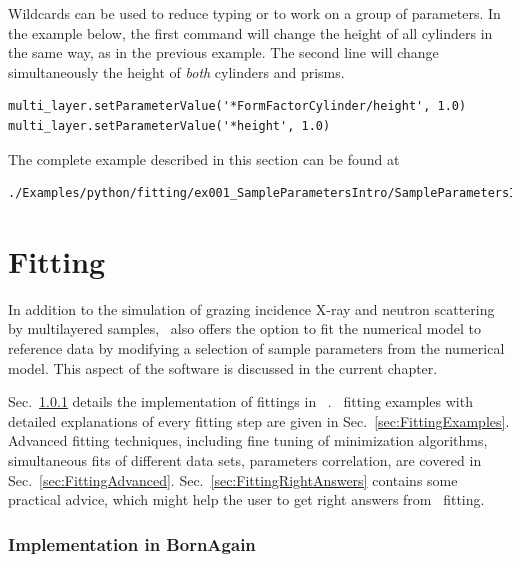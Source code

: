Wildcards  can be used to reduce typing or to work on a group
of parameters. In the example below, the first command will change the
height of all cylinders in the same way, as in the previous example. The second line will change simultaneously the height of {\it both} cylinders and prisms.
\begin{lstlisting}[language=shell, style=commandline]
multi_layer.setParameterValue('*FormFactorCylinder/height', 1.0)
multi_layer.setParameterValue('*height', 1.0)
\end{lstlisting}

The complete example described in this section can be found at
\begin{lstlisting}[language=shell, style=commandline]
./Examples/python/fitting/ex001_SampleParametersIntro/SampleParametersIntro.py
\end{lstlisting}

\section{Fitting} \label{sec:Fitting}

In addition to the simulation of grazing incidence
X-ray and neutron scattering by
multilayered samples, \BornAgain\ also offers the option to
fit the numerical model to reference data by modifying a selection of
sample parameters from the numerical model.  This aspect
of the software is discussed in the current chapter.

Sec.~\ref{sec:FittingImplementation} details the
implementation of fittings in \BornAgain\ .
\Python\ fitting examples with detailed
explanations of every fitting step are given in Sec.~\ref{sec:FittingExamples}. Advanced fitting techniques, including fine tuning of minimization
algorithms, simultaneous fits of different data sets, parameters
correlation, are covered in
Sec.~\ref{sec:FittingAdvanced}. Sec.~\ref{sec:FittingRightAnswers} contains some practical advice, which might
help the user to get right answers from \BornAgain\ fitting.


\subsubsection{Implementation in BornAgain} \label{sec:FittingImplementation}

